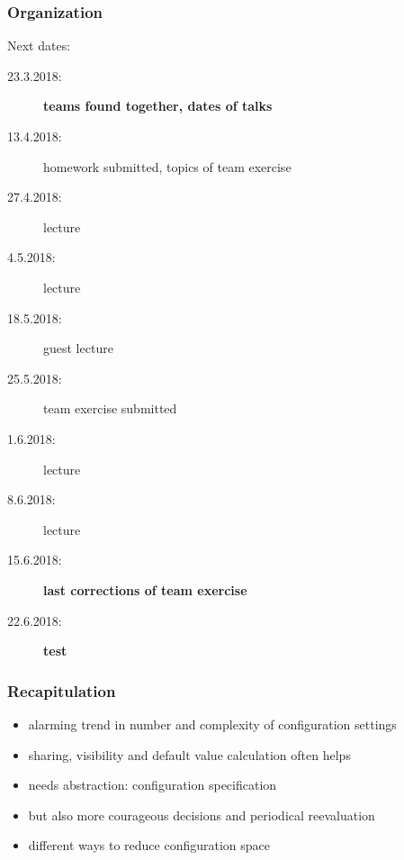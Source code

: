 




\date{23.3.2018}



\renewcommand{\enquote}[1]{\emph{``#1''}} %

\begin{frame}
	\titlepage
	\doclicenseThis
\end{frame}

\begin{frame}
	\frametitle{Organization}
	Next dates:
	\begin{description}
		\item[23.3.2018:] \textbf{teams found together, dates of talks}
		\item[13.4.2018:] homework submitted, topics of team exercise
		\item[27.4.2018:] lecture
		\item[4.5.2018:] lecture
		\item[18.5.2018:] guest lecture
		\item[25.5.2018:] team exercise submitted
		\item[1.6.2018:] lecture
		\item[8.6.2018:] lecture
		\item[15.6.2018:] \textbf{last corrections of team exercise}
		\item[22.6.2018:] \textbf{test}
	\end{description}
\end{frame}

\begin{frame}[fragile]
	\frametitle{Recapitulation}

	\begin{itemize}[<+-| alert@+>]
	\item alarming trend in number and complexity of configuration settings
	\item sharing, visibility and default value calculation often helps
	\item needs abstraction: configuration specification
	\item but also more courageous decisions and periodical reevaluation
	\item different ways to reduce configuration space
	\end{itemize}
\end{frame}

